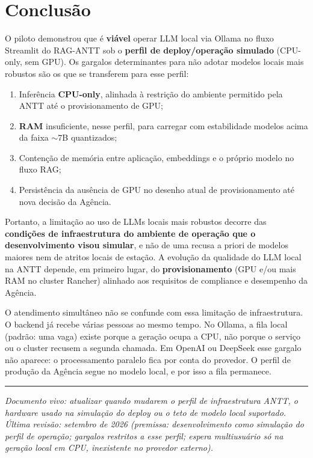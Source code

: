 \documentclass[12pt, a4paper]{article}
\begin{document}
\section{Conclusão}

O piloto demonstrou que é \textbf{viável} operar LLM local via Ollama no fluxo Streamlit do RAG-ANTT sob o \textbf{perfil de deploy/operação simulado} (CPU-only, sem GPU). Os gargalos determinantes para não adotar modelos locais mais robustos são os que se transferem para esse perfil:

\begin{enumerate}[label=\textbf{\arabic*.}]
  \item Inferência \textbf{CPU-only}, alinhada à restrição do ambiente permitido pela ANTT até o provisionamento de GPU;
  \item \textbf{RAM} insuficiente, nesse perfil, para carregar com estabilidade modelos acima da faixa $\sim$7B quantizados;
  \item Contenção de memória entre aplicação, embeddings e o próprio modelo no fluxo RAG;
  \item Persistência da ausência de GPU no desenho atual de provisionamento até nova decisão da Agência.
\end{enumerate}

Portanto, a limitação ao uso de LLMs locais mais robustos decorre das \textbf{condições de infraestrutura do ambiente de operação que o desenvolvimento visou simular}, e não de uma recusa a priori de modelos maiores nem de atritos locais de estação. A evolução da qualidade do LLM local na ANTT depende, em primeiro lugar, do \textbf{provisionamento} (GPU e/ou mais RAM no cluster Rancher) alinhado aos requisitos de compliance e desempenho da Agência.

O atendimento simultâneo não se confunde com essa limitação de infraestrutura. O backend já recebe várias pessoas ao mesmo tempo. No Ollama, a fila local (padrão: uma vaga) existe porque a geração ocupa a CPU, não porque o serviço ou o cluster recusem a segunda chamada. Em OpenAI ou DeepSeek esse gargalo não aparece: o processamento paralelo fica por conta do provedor. O perfil de produção da Agência segue no modelo local, e por isso a fila permanece.

\vspace{1cm}
\begin{center}
\rule{0.5\textwidth}{0.4pt}
\end{center}
\vspace{0.5cm}

\noindent\textit{Documento vivo: atualizar quando mudarem o perfil de infraestrutura ANTT, o hardware usado na simulação do deploy ou o teto de modelo local suportado. Última revisão: setembro de 2026 (premissa: desenvolvimento como simulação do perfil de operação; gargalos restritos a esse perfil; espera multiusuário só na geração local em CPU, inexistente no provedor externo).}
\end{document}
